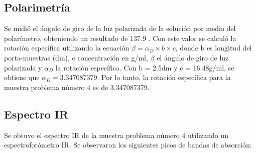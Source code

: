 \documentclass{article}
\begin{document}
\subsection{Polarimetría}

Se midió el ángulo de giro de la luz polarizada de la solución por medio del polarímetro, obteniendo un resultado de 137.9 \degree. Con este valor se calculó la rotación específica utilizando la ecuación $\beta = {\alpha}_D \times b \times c$, donde b es longitud del porta-muestras (dm), c concentración en g/ml, $\beta$ el ángulo de giro de luz polarizada y ${\alpha}_D$ la rotación específica. Con b = 2.5dm y c = 16.48g/ml, se obtiene que ${\alpha}_D = 3.347087379$. Por lo tanto, la rotación específica para la muestra problema número 4 es de 3.347087379.

\subsection{Espectro IR}

Se obtuvo el espectro IR de la muestra problema número 4 utilizando un espectrofotómetro IR. Se observaron los siguientes picos de bandas de absorción:
\end{document}
